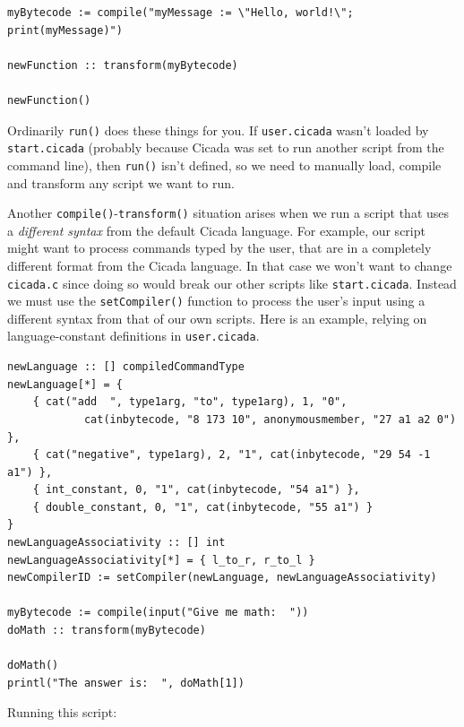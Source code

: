 \documentclass{article}
\newenvironment{code}{
       \begin{list}{}{
               \setlength{\leftmargin}{.4in}
               \setlength{\rightmargin}{0in}
               \setlength{\topsep}{.2in}
       }
       \small
       \item[] }
       { \end{list}   }
\begin{document}
\begin{code} \begin{verbatim}
myBytecode := compile("myMessage := \"Hello, world!\"; print(myMessage)")

newFunction :: transform(myBytecode)

newFunction()
\end{verbatim} \end{code}

\noindent Ordinarily \verb#run()# does these things for you.  If \verb#user.cicada# wasn't loaded by \verb#start.cicada# (probably because Cicada was set to run another script from the command line), then \verb#run()# isn't defined, so we need to manually load, compile and transform any script we want to run.

Another \verb#compile()#-\verb#transform()# situation arises when we run a script that uses a \emph{different syntax} from the default Cicada language.  For example, our script might want to process commands typed by the user, that are in a completely different format from the Cicada language.  In that case we won't want to change \verb#cicada.c# since doing so would break our other scripts like \verb#start.cicada#.  Instead we must use the \verb#setCompiler()# function to process the user's input using a different syntax from that of our own scripts.  Here is an example, relying on language-constant definitions in \verb#user.cicada#.

\begin{code} \begin{verbatim}
newLanguage :: [] compiledCommandType
newLanguage[*] = {
    { cat("add  ", type1arg, "to", type1arg), 1, "0",
            cat(inbytecode, "8 173 10", anonymousmember, "27 a1 a2 0") },
    { cat("negative", type1arg), 2, "1", cat(inbytecode, "29 54 -1 a1") },
    { int_constant, 0, "1", cat(inbytecode, "54 a1") },
    { double_constant, 0, "1", cat(inbytecode, "55 a1") }
}
newLanguageAssociativity :: [] int
newLanguageAssociativity[*] = { l_to_r, r_to_l }
newCompilerID := setCompiler(newLanguage, newLanguageAssociativity)

myBytecode := compile(input("Give me math:  "))
doMath :: transform(myBytecode)

doMath()
printl("The answer is:  ", doMath[1])
\end{verbatim} \end{code}

\noindent Running this script:
\end{document}
